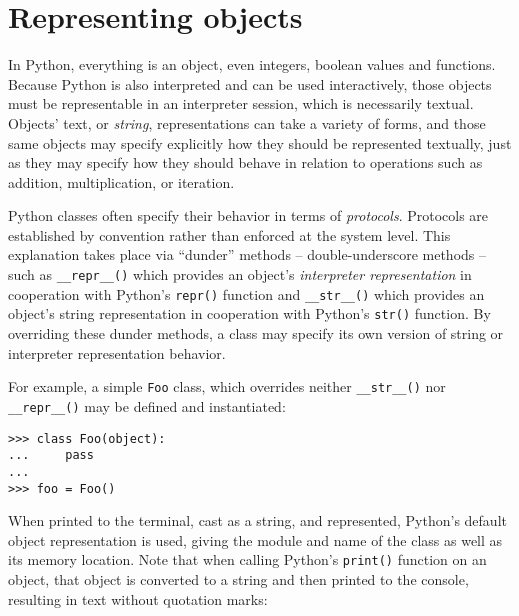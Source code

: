 \section{Representing objects}

In Python, everything is an object, even integers, boolean values and
functions. Because Python is also interpreted and can be used interactively,
those objects must be representable in an interpreter session, which is
necessarily textual. Objects' text, or \emph{string}, representations can take
a variety of forms, and those same objects may specify explicitly how they
should be represented textually, just as they may specify how they should
behave in relation to operations such as addition, multiplication, or
iteration.

Python classes often specify their behavior in terms of \emph{protocols}.
Protocols are established by convention rather than enforced at the system
level. This explanation takes place via \enquote{dunder} methods --
double-underscore methods -- such as \texttt{\_\_repr\_\_()} which provides an
object's \emph{interpreter representation} in cooperation with Python's
\texttt{repr()} function and \texttt{\_\_str\_\_()} which provides an object's
string representation in cooperation with Python's \texttt{str()}
function. By overriding these dunder methods, a class may specify its own
version of string or interpreter representation behavior.

For example, a simple \texttt{Foo} class, which overrides neither
\texttt{\_\_str\_\_()} nor \texttt{\_\_repr\_\_()} may be defined and
instantiated:

\begin{comment}
<abjad>
class Foo(object):
    pass

foo = Foo()
</abjad>
\end{comment}

\begin{abjadbookoutput}
\begin{singlespacing}
\vspace{-0.5\baselineskip}
\begin{lstlisting}
>>> class Foo(object):
...     pass
...
>>> foo = Foo()
\end{lstlisting}
\end{singlespacing}
\end{abjadbookoutput}

\noindent When printed to the terminal, cast as a string, and represented,
Python's default object representation is used, giving the module and name of
the class as well as its memory location. Note that when calling Python's
\texttt{print()} function on an object, that object is converted to a string
and then printed to the console, resulting in text without quotation marks:

